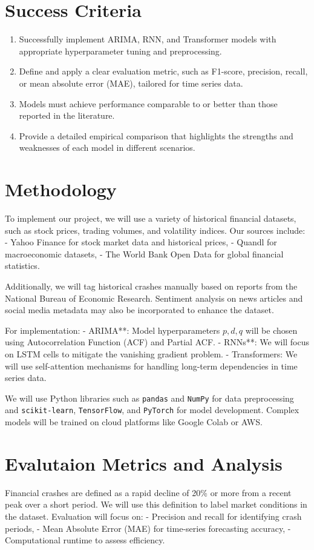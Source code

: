 \documentclass[12pt, letterpaper]{article}
\begin{document}
\section*{Success Criteria}
    \begin{enumerate}[label=-]
        \item Successfully implement ARIMA, RNN, and Transformer models with appropriate hyperparameter tuning and preprocessing.
        \item Define and apply a clear evaluation metric, such as F1-score, precision, recall, or mean absolute error (MAE), tailored for time series data.
        \item Models must achieve performance comparable to or better than those reported in the literature.
        \item Provide a detailed empirical comparison that highlights the strengths and weaknesses of each model in different scenarios.
    \end{enumerate}
\section*{Methodology}
    To implement our project, we will use a variety of historical financial datasets, such as stock prices, trading volumes, and volatility indices. Our sources include:
    - Yahoo Finance for stock market data and historical prices,
    - Quandl for macroeconomic datasets,
    - The World Bank Open Data for global financial statistics.

    Additionally, we will tag historical crashes manually based on reports from the National Bureau of Economic Research. Sentiment analysis on news articles and social media metadata may also be incorporated to enhance the dataset.

    For implementation:
    - ARIMA**: Model hyperparameters \( p, d, q \) will be chosen using Autocorrelation Function (ACF) and Partial ACF.
    - RNNs**: We will focus on LSTM cells to mitigate the vanishing gradient problem.
    - Transformers: We will use self-attention mechanisms for handling long-term dependencies in time series data.

    We will use Python libraries such as \texttt{pandas} and \texttt{NumPy} for data preprocessing and \texttt{scikit-learn}, \texttt{TensorFlow}, and \texttt{PyTorch} for model development. Complex models will be trained on cloud platforms like Google Colab or AWS.
\section*{Evalutaion Metrics and Analysis}
    Financial crashes are defined as a rapid decline of 20\% or more from a recent peak over a short period. We will use this definition to label market conditions in the dataset. Evaluation will focus on:
    - Precision and recall for identifying crash periods,
    - Mean Absolute Error (MAE) for time-series forecasting accuracy,
    - Computational runtime to assess efficiency.
\end{document}
